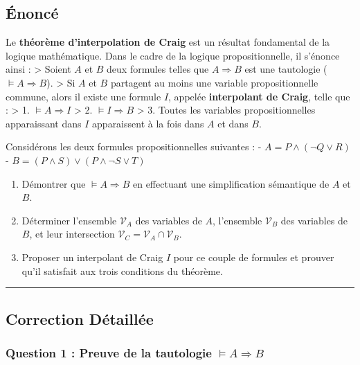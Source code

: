 \documentclass[11pt,a4paper]{article}
\begin{document}
\hypertarget{uxe9noncuxe9}{%
\subsection{Énoncé}\label{uxe9noncuxe9}}

Le \textbf{théorème d'interpolation de Craig} est un résultat
fondamental de la logique mathématique. Dans le cadre de la logique
propositionnelle, il s'énonce ainsi : \textgreater{} Soient \(A\) et
\(B\) deux formules telles que \(A \Rightarrow B\) est une tautologie
(\(\models A \Rightarrow B\)). \textgreater{} Si \(A\) et \(B\)
partagent au moins une variable propositionnelle commune, alors il
existe une formule \(I\), appelée \textbf{interpolant de Craig}, telle
que : \textgreater{} 1. \(\models A \Rightarrow I\) \textgreater{} 2.
\(\models I \Rightarrow B\) \textgreater{} 3. Toutes les variables
propositionnelles apparaissant dans \(I\) apparaissent à la fois dans
\(A\) et dans \(B\).

Considérons les deux formules propositionnelles suivantes : -
\(A = P \land (\neg Q \lor R)\) -
\(B = (P \land S) \lor (P \land \neg S \lor T)\)

\begin{enumerate}
\def\labelenumi{\arabic{enumi}.}
\tightlist
\item
  Démontrer que \(\models A \Rightarrow B\) en effectuant une
  simplification sémantique de \(A\) et \(B\).
\item
  Déterminer l'ensemble \(\mathcal{V}_A\) des variables de \(A\),
  l'ensemble \(\mathcal{V}_B\) des variables de \(B\), et leur
  intersection \(\mathcal{V}_C = \mathcal{V}_A \cap \mathcal{V}_B\).
\item
  Proposer un interpolant de Craig \(I\) pour ce couple de formules et
  prouver qu'il satisfait aux trois conditions du théorème.
\end{enumerate}

\begin{center}\rule{0.5\linewidth}{0.5pt}\end{center}

\hypertarget{correction-duxe9tailluxe9e}{%
\subsection{Correction Détaillée}\label{correction-duxe9tailluxe9e}}

\hypertarget{question-1-preuve-de-la-tautologie-models-a-rightarrow-b}{%
\subsubsection{\texorpdfstring{Question 1 : Preuve de la tautologie
\(\models A \Rightarrow B\)}{Question 1 : Preuve de la tautologie \textbackslash models A \textbackslash Rightarrow B}}\label{question-1-preuve-de-la-tautologie-models-a-rightarrow-b}}
\end{document}
